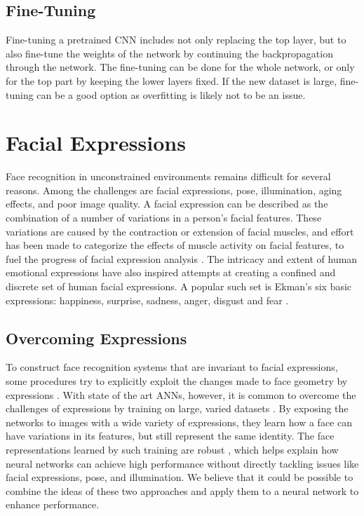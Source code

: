 \subsection{Fine-Tuning}

Fine-tuning a pretrained CNN includes not only replacing the top layer, but to also fine-tune the weights of the network by continuing the backpropagation through the network. The fine-tuning can be done for the whole network, or only for the top part by keeping the lower layers fixed. If the new dataset is large, fine-tuning can be a good option as overfitting is likely not to be an issue. 



\section{Facial Expressions} %

Face recognition in unconstrained environments remains difficult for several reasons. Among the challenges are facial expressions, pose, illumination, aging effects, and poor image quality. A facial expression can be described as the combination of a number of variations in a person's facial features. These variations are caused by the contraction or extension of facial muscles, and effort has been made to categorize the effects of muscle activity on facial features, to fuel the progress of facial expression analysis \cite{exp_db}. The intricacy and extent of human emotional expressions have also inspired attempts at creating a confined and discrete set of human facial expressions. A popular such set is Ekman's six basic expressions: happiness, surprise, sadness, anger, disgust and fear \cite{ekman}.

\subsection{Overcoming Expressions}

To construct face recognition systems that are invariant to facial expressions, some procedures try to explicitly exploit the changes made to face geometry by expressions \cite{exp_inv_1, exp_inv_2, exp_inv_3}. With state of the art ANNs, however, it is common to overcome the challenges of expressions by training on large, varied datasets \cite{facenet, deepface, deepid3}. By exposing the networks to images with a wide variety of expressions, they learn how a face can have variations in its features, but still represent the same identity. The face representations learned by such training are robust \cite{robust}, which helps explain how neural networks can achieve high performance without directly tackling issues like facial expressions, pose, and illumination. We believe that it could be possible to combine the ideas of these two approaches and apply them to a neural network to enhance performance. 

